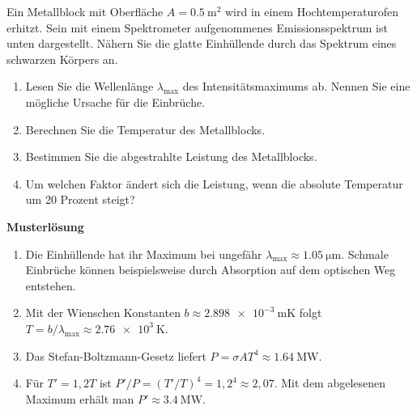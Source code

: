 \begin{ExerciseBlock}
Ein Metallblock mit Oberfläche $A=\qty{0.5}{\metre\squared}$ wird in einem Hochtemperaturofen erhitzt. Sein mit einem Spektrometer aufgenommenes Emissionsspektrum ist unten dargestellt. Nähern Sie die glatte Einhüllende durch das Spektrum eines schwarzen Körpers an.
\begin{center}
\end{center}
\begin{enumerate}
\item Lesen Sie die Wellenlänge $\lambda_\mathrm{max}$ des Intensitätsmaximums ab. Nennen Sie eine mögliche Ursache für die Einbrüche.
\item Berechnen Sie die Temperatur des Metallblocks.
\item Bestimmen Sie die abgestrahlte Leistung des Metallblocks.
\item Um welchen Faktor ändert sich die Leistung, wenn die absolute Temperatur um 20 Prozent steigt?
\end{enumerate}
\end{ExerciseBlock}
\begin{Solution}
\par\medskip\noindent\textbf{Musterlösung}\par\nopagebreak[4]
\begin{enumerate}
\item Die Einhüllende hat ihr Maximum bei ungefähr $\lambda_\mathrm{max}\approx\qty{1.05}{\micro\metre}$. Schmale Einbrüche können beispielsweise durch Absorption auf dem optischen Weg entstehen.
\item Mit der Wienschen Konstanten $b\approx\qty{2.898e-3}{\metre\kelvin}$ folgt $T=b/\lambda_\mathrm{max}\approx\qty{2.76e3}{\kelvin}$.
\item Das Stefan-Boltzmann-Gesetz liefert $P=\sigma AT^4\approx\qty{1.64}{\mega\watt}$.
\item Für $T'=1{,}2T$ ist $P'/P=(T'/T)^4=1{,}2^4\approx2{,}07$. Mit dem abgelesenen Maximum erhält man $P'\approx\qty{3.4}{\mega\watt}$.
\end{enumerate}
\end{Solution}
